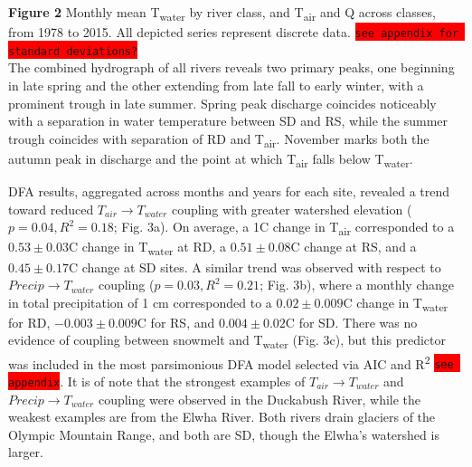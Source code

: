 \documentclass[notitlepage]{article}
\begin{document}
\textbf{Figure 2} Monthly mean T\textsubscript{water} by river class, and T\textsubscript{air} and Q across classes, from 1978 to 2015. All depicted series represent discrete data. \colorbox{red}{\lstinline{see appendix for standard deviations?}} \setlength{\parskip}{6pt}\\[\baselineskip]

The combined hydrograph of all rivers reveals two primary peaks, one beginning in late spring and the other extending from late fall to early winter, with a prominent trough in late summer. Spring peak discharge coincides noticeably with a separation in water temperature between SD and RS, while the summer trough coincides with separation of RD and T\textsubscript{air}. November marks both the autumn peak in discharge and the point at which T\textsubscript{air} falls below T\textsubscript{water}.

\sloppy
DFA results, aggregated across months and years for each site, revealed a trend toward reduced $T_{air}\rightarrow T_{water}$ coupling with greater watershed elevation ($p=0.04, R^2=0.18$; Fig. 3a). On average, a 1\degree C change in T\textsubscript{air} corresponded to a $0.53\pm 0.03$\degree C change in T\textsubscript{water} at RD, a $0.51\pm 0.08$\degree C change at RS, and a $0.45\pm 0.17$\degree C change at SD sites. A similar trend was observed with respect to $Precip\rightarrow T_{water}$ coupling ($p=0.03, R^2=0.21$; Fig. 3b), where a monthly change in total precipitation of 1 cm corresponded to a $0.02\pm 0.009$\degree C change in T\textsubscript{water} for RD, $-0.003\pm 0.009$\degree C for RS, and $0.004\pm 0.02$\degree C for SD. There was no evidence of coupling between snowmelt and T\textsubscript{water} (Fig. 3c), but this predictor was included in the most parsimonious DFA model selected via AIC and R\textsuperscript{2} \colorbox{red}{\lstinline{see appendix}}. It is of note that the strongest examples of $T_{air}\rightarrow T_{water}$ and $Precip\rightarrow T_{water}$ coupling were observed in the Duckabush River, while the weakest examples are from the Elwha River. Both rivers drain glaciers of the Olympic Mountain Range, and both are SD, though the Elwha's watershed is larger.
\end{document}
